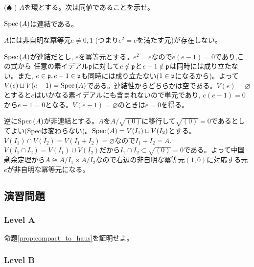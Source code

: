 \begin{egprob} ($\spadesuit$ \cite{har})
$A$を環とする。次は同値であることを示せ。
\ben
\item $\mathrm{Spec}\left( A \right)$は連結である。
\item $A$には非自明な冪等元$e\neq 0,1$ (つまり$e^2=e$を満たす元)が存在しない。
\een
\end{egprob}
\begin{egans}
$\mathrm{Spec}\left( A \right)$が連結だとし, $e$を冪等元とする。$e^2 = e$なので$e(e-1)=0$であり,この式から 任意の素イデアル$\mathfrak{p}$に対して$e\notin \mathfrak{p}$と$e-1\notin \mathfrak{p}$は同時には成り立たない。また, $e\in \mathfrak{p}, e-1\in \mathfrak{p}$も同時には成り立たない($1\in \mathfrak{p}$になるから)。よって$V(e)\sqcup V(e-1) = \mathrm{Spec}\left( A \right)$である。連結性からどちらかは空である。$V(e) = \varnothing$とすると$e$はいかなる素イデアルにも含まれないので単元であり, $e(e-1) = 0$から$e-1=0$となる。$V(e-1) = \varnothing$のときは$e=0$を得る。\par
逆に$\mathrm{Spec}\left( A \right)$が非連結とする。$A$を$A/\sqrt{(0)}$に移行して$\sqrt{(0)} = 0$であるとしてよい(Specは変わらない)。$\mathrm{Spec}\left( A \right) = V(I_1)\sqcup V(I_2)$とする。$V(I_1)\cap V(I_2) = V(I_1+I_2) = \varnothing$なので$I_1+I_2 = A$. $V(I_1\cap I_2) = V(I_1) \cup V(I_2)$だから$I_1\cap I_2 \subset \sqrt{(0)} = 0$である。よって中国剰余定理から$A\cong A/I_1 \times A/I_2$なので右辺の非自明な冪等元$(1,0)$に対応する元$e$が非自明な冪等元になる。
\end{egans}


\subsection{演習問題}
\subsubsection{Level A}
\begin{prob}
命題\ref{prop:compact_to_haus}を証明せよ。
\end{prob}
\begin{hint}
\end{hint}

\subsubsection{Level B}




